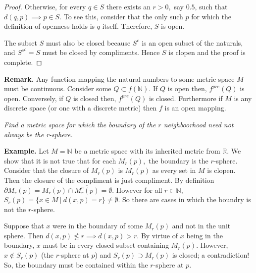 \documentclass[letter]{article}
\newenvironment{menumerate}{%
  \edef\backupindent{\the\parindent}%
  \enumerate%
  \setlength{\parindent}{\backupindent}%
}{\endenumerate}
\begin{document}
\begin{menumerate}
\begin{proof}
				Otherwise, for every $q \in S$ there exists an $r > 0,$ say $0.5$, such that $d(q,p) \implies p \in S.$ To see this, consider  that the only such $p$ for which the definition of openness holds is $q$ itself. Therefore, $S$ is open.

				The subset $S$ must also be closed because $S^c$ is an open subset of the naturals, and ${S^c}^c = S$ must be closed by compliments. Hence $S$ is clopen and the proof is complete. 
			\end{proof}

			\textbf{Remark.} Any function mapping the natural numbers to some metric space $M$ must be continuous. Consider some $Q \subset f(\mathbb{N}).$ If $Q$ is open then, $f^{pre}(Q)$ is open. Conversely, if $Q$ is closed then, $f^{pre}(Q)$ is closed. Furthermore if $M$ is any discrete space (or one with a discrete metric) then $f$ is an open mapping.


		
		\item \emph{Find a metric space for which the boundary of the $r$ neighboorhood need not always be the r-sphere.} 

		\textbf{Example.} Let $M = \mathbb{N}$ be a metric space with its inherited metric from $\mathbb{R}.$ We show that it is not true that for each $M_r(p),$ the boundary is the $r$-sphere. Consider that the closure of $M_r(p)$ is $M_r(p)$ as every set in $M$ is clopen. Then  the closure of the compliment is just compliment. By definition $\partial M_r(p) = \overline{M_r(p)} \cap \overline{M_r^c(p)} = \emptyset.$ However  for all $r \in \mathbb{N},$ $S_r(p) = \{x \in M\ | \ d(x,p) = r\} \neq \emptyset.$ So there are cases in which the boundry is not the $r$-sphere.

		Suppose that $x$ were in the boundary of some $M_r(p)$ and not in the unit sphere. Then $d(x,p) \nleq r \implies d(x,p) > r.$ By virtue of $x$ being in the boundary, $x$ must be in every closed subset containing $M_r(p)$. However, $x \notin S_r(p)$ (the $r$-sphere at $p$) and $S_r(p) \supset M_r(p)$ is closed; a contradiction! So, the boundary must be contained within the $r$-sphere at $p$. 



\end{menumerate}
\end{document}
